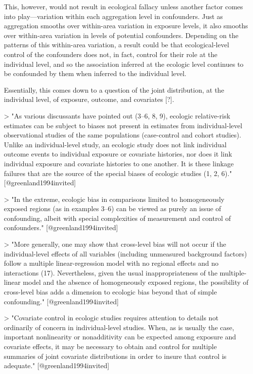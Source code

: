 This, however, would not result in ecological fallacy unless another factor
comes into play---variation within each aggregation level in confounders. 
Just as aggregation smooths over within-area variation in exposure levels, it
also smooths over within-area variation in levels of potential confounders. 
Depending on the patterns of this within-area variation, a result could be
that ecological-level control of the confounders does not, in fact, control
for their role at the individual level, and so the association inferred at
the ecologic level continues to be confounded by them when inferred to the
individual level. 

Essentially, this comes down to a question of the joint distribution, at the
individual level, of exposure, outcome, and covariates [?].

> "As various discussants have pointed out (3--6, 8, 9), ecologic relative-risk
estimates can be subject to biases not present in estimates from individual-level
observational studies of the same populations (case-control and cohort studies).
Unlike an individual-level study, an ecologic study does not link individual
outcome events to individual exposure or covariate histories, nor does it
link individual exposure and covariate histories to one another. It is these
linkage failures that are the source of the special biases of ecologic studies
(1, 2, 6)." [@greenland1994invited]

> "In the extreme, ecologic bias in comparisons limited to homogeneously exposed
regions (as in examples 3--6) can be viewed as purely an issue of confounding,
albeit with special complexities of measurement and control of confounders."
[@greenland1994invited]

> "More generally, one may show that cross-level bias will not occur if the 
individual-level effects of all variables (including unmeasured background
factors) follow a multiple linear-regression model with no regional effects and
no interactions (17). Nevertheless, given the usual inappropriateness of the 
multiple-linear model and the absence of homogeneously exposed regions, the 
possibility of cross-level bias adds a dimension to ecologic bias beyond
that of simple confounding." [@greenland1994invited]

> "Covariate control in ecologic studies requires attention to details not 
ordinarily of concern in individual-level studies. When, as is usually the
case, important nonlinearity or nonadditivity can be expected among 
exposure and covariate effects, it may be necessary to obtain and 
control for multiple summaries of joint covariate distributions in order
to insure that control is adequate." [@greenland1994invited]

